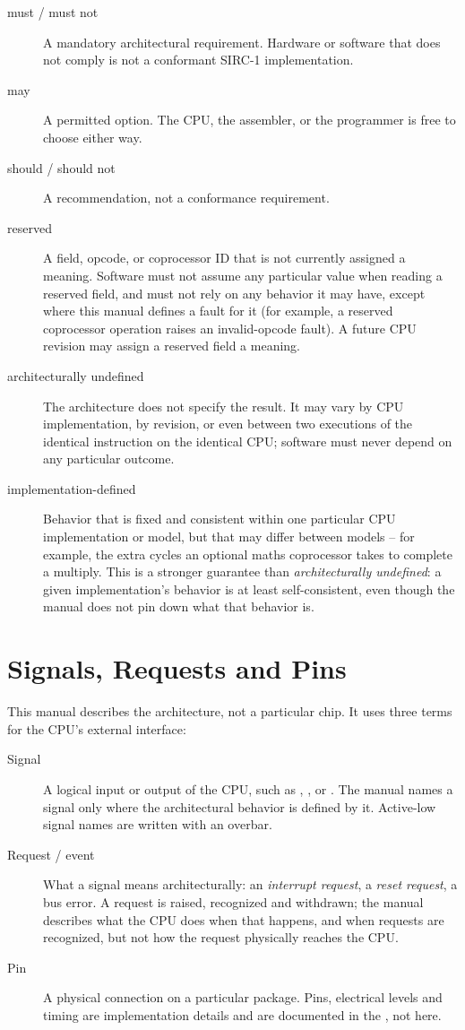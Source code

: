 \begin{description}
	\item[must / must not] A mandatory architectural requirement. Hardware or software that does not comply is not a conformant
	      SIRC-1 implementation.
	\item[may] A permitted option. The CPU, the assembler, or the programmer is free to choose either way.
	\item[should / should not] A recommendation, not a conformance requirement.
	\item[reserved] A field, opcode, or coprocessor ID that is not currently assigned a meaning. Software must not assume any
	      particular value when reading a reserved field, and must not rely on any behavior it may have, except where this manual
	      defines a fault for it (for example, a reserved coprocessor operation raises an invalid-opcode fault). A future CPU
	      revision may assign a reserved field a meaning.
	\item[architecturally undefined] The architecture does not specify the result. It may vary by CPU implementation, by
	      revision, or even between two executions of the identical instruction on the identical CPU; software must never depend
	      on any particular outcome.
	\item[implementation-defined] Behavior that is fixed and consistent within one particular CPU implementation or model, but
	      that may differ between models -- for example, the extra cycles an optional maths coprocessor takes to complete a
	      multiply. This is a stronger guarantee than \textit{architecturally undefined}: a given implementation's behavior is at
	      least self-consistent, even though the manual does not pin down what that behavior is.
\end{description}

\section*{Signals, Requests and Pins}

This manual describes the architecture, not a particular chip. It uses three terms for the CPU's external interface:

\begin{description}
	\item[Signal] A logical input or output of the CPU, such as , ,  or
	      . The manual names a signal only where the architectural behavior is defined by it. Active-low signal
	      names are written with an overbar.
	\item[Request / event] What a signal means architecturally: an \textit{interrupt request}, a \textit{reset request}, a bus
	      error. A request is raised, recognized and withdrawn; the manual describes what the CPU does when that happens, and
	      when requests are recognized, but not how the request physically reaches the CPU.
	\item[Pin] A physical connection on a particular package. Pins, electrical levels and timing are implementation details and
	      are documented in the \hwmanual{}, not here.
\end{description}

